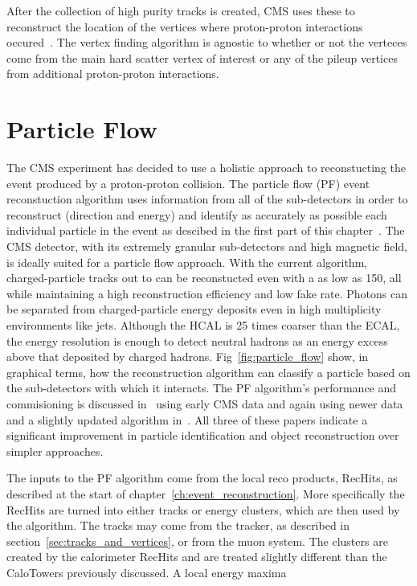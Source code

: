 After the collection of high purity tracks is created, CMS uses these to reconstruct the location of the vertices where proton-proton interactions occured~\cite{TrackingJINST}.
The vertex finding algorithm is agnostic to whether or not the verteces come from the main hard scatter vertex of interest or any of the pileup vertices from additional proton-proton interactions.



\section{Particle Flow}
\label{sec:particle_flow}

The CMS experiment has decided to use a holistic approach to reconstucting the event produced by a proton-proton collision.
The particle flow (PF) event reconstuction algorithm uses information from all of the sub-detectors in order to reconstruct (direction and energy) and identify as accurately as possible each individual particle in the event as descibed in the first part of this chapter~\cite{CMS-PAS-PFT-09-001}.
The CMS detector, with its extremely granular sub-detectors and high magnetic field, is ideally suited for a particle flow approach.
With the current algorithm, charged-particle tracks out to  can be reconstucted even with a \pt as low as 150\mev, all while maintaining a high reconstruction efficiency and low fake rate.
Photons can be separated from charged-particle energy deposits even in high multiplicity environments like jets.
Although the HCAL is 25 times coarser than the ECAL, the energy resolution is enough to detect neutral hadrons as an energy excess above that deposited by charged hadrons.
Fig~\ref{fig:particle_flow} show, in graphical terms, how the reconstruction algorithm can classify a particle based on the sub-detectors with which it interacts.
The PF algorithm's performance and commisioning is discussed in~\cite{CMS-PAS-PFT-10-002,CMS-PAS-PFT-10-003} using early CMS data and again using newer data and a slightly updated algorithm in~\cite{Beaudette:2014cea}.
All three of these papers indicate a significant improvement in particle identification and object reconstruction over simpler approaches.

The inputs to the PF algorithm come from the local reco products, RecHits, as described at the start of chapter~\ref{ch:event_reconstruction}. More specifically the RecHits are turned into either tracks or energy clusters, which are then used by the algorithm. The tracks may come from the tracker, as described in section~\ref{sec:tracks_and_vertices}, or from the muon system. The clusters are created by the calorimeter RecHits and are treated slightly different than the CaloTowers previously discussed. A local energy maxima










